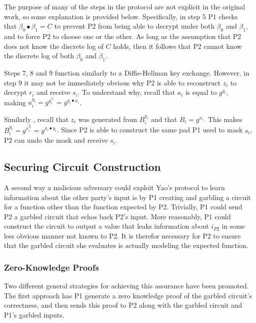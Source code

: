 The purpose of many of the steps in the protocol are not explicit in the original work\cite{bellare1990non}, so some explanation is provided below.  Specifically, in step 5 \ac{P1} checks that $\beta_0 \bullet \beta_1 = C$ to prevent \ac{P2} from being able to decrypt under both $\beta_0$ and $\beta_1$, and to force \ac{P2} to choose one or the other. As long as the assumption that \ac{P2} does not know the discrete log of $C$ holds, then it follows that \ac{P2} cannot know the discrete log of both $\beta_0$ and $\beta_1$.

Steps 7, 8 and 9 function similarly to a Diffie-Hellman key exchange.  However, in step 9 it may not be immediately obvious why \ac{P2} is able to reconstruct $z_i$ to decrypt $r_i$ and receive $s_i$.  To understand why, recall that $a_i$ is equal to $g^{y_i}$, making $a^{y_i}_i = g^{y^{x_i}_i} = g^{y_i \bullet x_i}$.

Similarly , recall that $z_i$ was generated from $B^{y_i}_i$ and that $B_i = g^{x_i}$.  This makes $B^{y_i}_i = g^{x^{y_i}_i} = g^{x_i \bullet y_i}$.  Since \ac{P2} is able to construct the same pad \ac{P1} used to mask $s_i$, \ac{P2} can undo the mask and receive $s_i$.


\subsection{Securing Circuit Construction}
\label{sec:securingcircuits}

A second way a malicious adversary could exploit Yao's protocol to learn information about the other party's input is by \ac{P1} creating and garbling a circuit for a function other than the function expected by \ac{P2}. Trivially, \ac{P1} could send \ac{P2} a garbled circuit that echos back \ac{P2}'s input.  More reasonably, \ac{P1} could construct the circuit to output a value that leaks information about $i_{P2}$ in some less obvious manner not known to \ac{P2}.  It is therefor necessary for \ac{P2} to ensure that the garbled circuit she evaluates is actually modeling the expected function.

\subsubsection{Zero-Knowledge Proofs}

Two different general strategies for achieving this assurance have been promoted.  The first approach has \ac{P1} generate a zero knowledge proof of the garbled circuit's correctness, and then sends this proof to \ac{P2} along with the garbled circuit and \ac{P1}'s garbled inputs\cite{goldreich1987play, goldreich2009foundations}.

